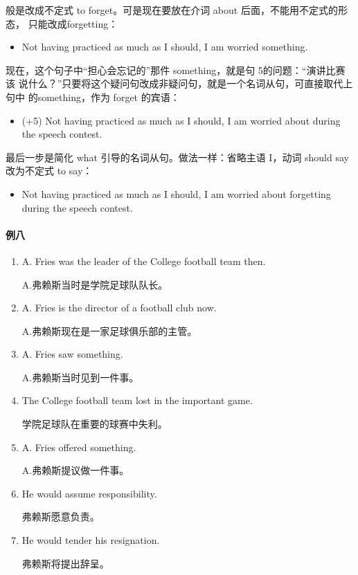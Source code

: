 般是改成不定式 to forget。可是现在要放在介词 about 后面，不能用不定式的形态，
只能改成forgetting：
\begin{itemize}
\item Not having practiced as much as I should, I am worried 
  something.
\end{itemize}
现在，这个句子中“担心会忘记的”那件 something，就是句 5的问题：“演讲比赛该
说什么？”只要将这个疑问句改成非疑问句，就是一个名词从句，可直接取代上句中
的something，作为 forget 的宾语：
\begin{itemize}
\item (+5) Not having practiced as much as I should, I am worried about
   during the speech contest.
\end{itemize}
最后一步是简化 what 引导的名词从句。做法一样：省略主语 I，动词 should
say 改为不定式 to say：
\begin{itemize}
\item Not having practiced as much as I should, I am worried about forgetting
   during the speech contest.
\end{itemize}

\paragraph{例八}

\begin{enumerate}
\item A. Fries was the leader of the College football team then.

  A.弗赖斯当时是学院足球队队长。
\item A. Fries is the director of a football club now.

  A.弗赖斯现在是一家足球俱乐部的主管。
\item A. Fries saw something.

  A.弗赖斯当时见到一件事。
\item The College football team lost in the important game.

  学院足球队在重要的球赛中失利。
\item A. Fries offered something.

  A.弗赖斯提议做一件事。
\item He would assume responsibility.

  弗赖斯愿意负责。
\item He would tender his resignation.

  弗赖斯将提出辞呈。
\end{enumerate}

